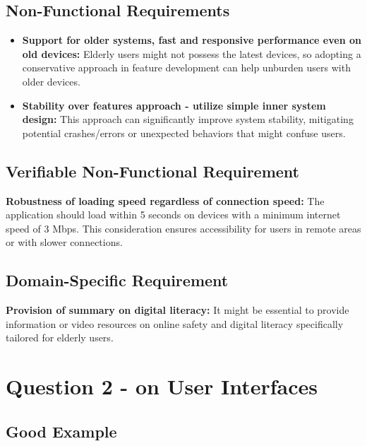 \documentclass[12pt,a4paper]{article}
\begin{document}
\subsection{Non-Functional Requirements}

\begin{itemize}
    \item \textbf{Support for older systems, fast and responsive performance even on old devices:} 
    Elderly users might not possess the latest devices, so adopting a conservative approach in feature development can help unburden users with older devices.

    \item \textbf{Stability over features approach - utilize simple inner system design:} 
    This approach can significantly improve system stability, mitigating potential crashes/errors or unexpected behaviors that might confuse users.
\end{itemize}

\subsection{Verifiable Non-Functional Requirement}

\textbf{Robustness of loading speed regardless of connection speed:} 
The application should load within 5 seconds on devices with a minimum internet speed of 3 Mbps. This consideration ensures accessibility for users in remote areas or with slower connections.

\subsection{Domain-Specific Requirement}

\textbf{Provision of summary on digital literacy:} 
It might be essential to provide information or video resources on online safety and digital literacy specifically tailored for elderly users.

\section{Question 2 - on User Interfaces}

\subsection{Good Example}
\end{document}
